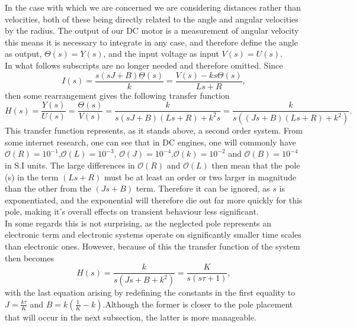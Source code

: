 \documentclass[a4paper,onecolumn,amsmath,amssymb]{revtex4-1}
\begin{document}
In the case with which we are concerned we are considering distances rather than velocities, both of these being directly related to the angle and angular velocities by the radius. The output of our DC motor is a measurement of angular velocity this means it is necessary to integrate in any case, and therefore define the angle as output, $\Theta(s)=Y(s)$, and the input voltage as input $V(s)=U(s)$.\\

In what follows subscripts are no longer needed and therefore omitted. Since \\
\begin{equation}
I(s)=\frac{s\left(sJ+B\right)\Theta(s)}{k}=\frac{V(s)-ks\Theta(s)}{L s +R},
\end{equation}
then some rearrangement gives the following transfer function
\begin{equation}
H(s)=\frac{Y(s)}{U(s)}=\frac{\Theta(s)}{V(s)}=\frac{k}{s(sJ+B)(Ls+R)+k^2s}=\frac{k}{s\left((Js+B)(Ls+R)+k^2\right)}.
\end{equation}
This transfer function represents, as it stands above, a second order system. From some internet research, one can see that in DC engines, one will commonly have $\mathcal{O}(R)=10^{-1}$,$\mathcal{O}(L)=10^{-3}$, $\mathcal{O}(J)=10^{-4}$,$\mathcal{O}(k)=10^{-2}$ and $\mathcal{O}(B)=10^{-4}$ in S.I units. The large differences in $\mathcal{O}(R)$ and $\mathcal{O}(L)$ then mean that the pole (s) in the term $(Ls+R)$ must be at least an order or two larger in magnitude than the other from the $(Js+B)$ term. Therefore it can be ignored, as $s$ is exponentiated, and the exponential will therefore die out far more quickly for this pole, making it's overall effects on transient behaviour less significant.\\

In some regards this is not surprising, as the neglected pole represents an electronic term and electronic systems operate on significantly smaller time scales than electronic ones. However, because of this the transfer function of the system then becomes
\begin{equation}
H(s)=\frac{k}{s\left(Js+B+k^2\right)}=\frac{K}{s\left(s\tau+1\right)},
\end{equation}
with the last equation arising by redefining the constants in the first equality to $J=\frac{k\tau}{K}$ and $B=k(\frac{1}{K}-k)$.Although the former is closer to the pole placement that will occur in the next subsection, the latter is more manageable.\\
\end{document}
